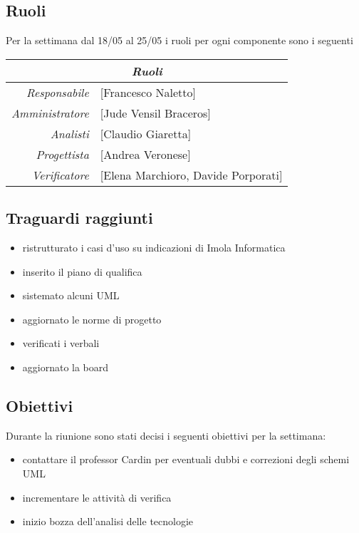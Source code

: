 \documentclass[12pt]{article}
\begin{document}
\subsection{Ruoli}
Per la settimana dal 18/05 al 25/05 i ruoli per ogni componente sono i seguenti
\\
\begin{tabular}{r | l}
    \multicolumn{2}{c}{\textit{Ruoli}}\\
    \hline
        \textit{Responsabile} &
        [Francesco Naletto]\makecell{}\\
        \textit{Amministratore} &
        [Jude Vensil Braceros]\makecell{}\\
        \textit{Analisti} &
        [Claudio Giaretta]\makecell{}\\
        \textit{Progettista} &
        [Andrea Veronese]\makecell{}\\
        \textit{Verificatore} & 
        [Elena Marchioro, Davide Porporati]\makecell{}\\
\end{tabular}

\subsection{Traguardi raggiunti}
\begin{itemize}
    \item ristrutturato i casi d'uso su indicazioni di Imola Informatica
    \item inserito il piano di qualifica
    \item sistemato alcuni UML
    \item aggiornato le norme di progetto
    \item verificati i verbali
    \item aggiornato la board
\end{itemize}

\subsection{Obiettivi}
Durante la riunione sono stati decisi i seguenti obiettivi per la settimana:
\begin{itemize}
    \item contattare il professor Cardin per eventuali dubbi e correzioni degli schemi UML
    \item incrementare le attività di verifica
    \item inizio bozza dell'analisi delle tecnologie
\end{itemize}
\end{document}
